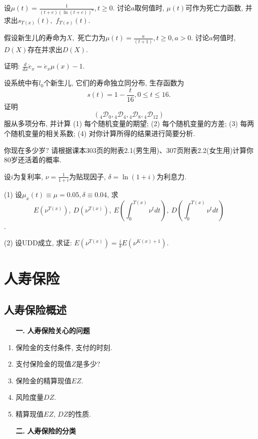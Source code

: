 \documentclass[a4paper,openany, 10pt]{ctexbook}
\newcommand{\hei}{\CJKfamily{hei}}      %
\def\z{\left}
\def\y{\right}
\begin{document}
\begin{exs}
    设$\mu(t)=\frac{1}{(t+e)(\ln (t+e))^a},t\ge0.$ 讨论$a$取何值时, $\mu(t)$可作为死亡力函数, 并求出$s_{T(x)}(t),$ $f_{T(x)}(t).$
\end{exs}

\begin{exs}
    假设新生儿的寿命为$X,$ 死亡力为$\mu(t)=\frac{a}{(t+1)},t\ge0, a>0.$ 讨论$a$何值时, $D(X)$存在并求出$D(X).$
\end{exs}

\begin{exs}
    证明: $\frac{d}{dx}\mathring e_x=\mathring e_x\mu(x)-1.$
\end{exs}

\begin{exs}设系统中有$l_0$个新生儿, 它们的寿命独立同分布, 生存函数为
    $$s(t)=1-\frac{t}{16}, 0\le t\le 16.$$ 证明$$({}_4\mathscr D_0, {}_4\mathscr D_4,{}_{4}\mathscr D_8, {}_{4}\mathscr D_{12})$$服从多项分布, 并计算 (1) 每个随机变量的期望; (2) 每个随机变量的方差; (3) 每两个随机变量的相关系数; (4) 对你计算所得的结果进行简要分析.
\end{exs}

\begin{exs}
    你现在多少岁? 请根据课本303页的附表2.1(男生用)、307页附表2.2(女生用)计算你80岁还活着的概率.
\end{exs}

\begin{exs}
    设$i$为复利率, $\nu=\frac{1}{1+i}$为贴现因子, $\delta=\ln (1+i)$为利息力.

    (1) 设$\mu_{x}(t)\equiv \mu =0.05, \delta\equiv 0.04$,
    求 $$E(\nu^{T(x)}),\ D(\nu^{T(x)}),\ E\z(\int_{0}^{T(x)}\nu^{t}dt\y),\ D\z(\int_{0}^{T(x)}\nu^{t}dt\y)$$.

    (2) 设UDD成立, 求证: $E(\nu^{T(x)})=\frac{i}{\delta}E\z(\nu^{K(x)+1}\y)$.
\end{exs}


\chapter{人寿保险}
\section{人寿保险概述}
\begin{itemize}
    \item[{\bf\hei 一.}]{\bf\hei 人寿保险关心的问题}
\end{itemize}
\begin{enumerate}
    \item 保险金的支付条件, 支付的时刻.
    \item 支付保险金的现值$Z$是多少?
    \item 保险金的精算现值$EZ$.
    \item 风险度量$DZ$.
    \item 精算现值$EZ$, $DZ$的性质.
\end{enumerate}
\begin{itemize}
    \item[{\bf\hei 二.}]{\bf\hei 人寿保险的分类}
\end{itemize}
\end{document}
